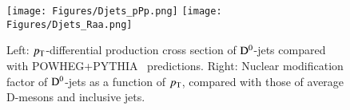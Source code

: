 \documentclass{webofc}
\newcommand{\pt}{p_{\rm T}}
\newcommand{\Dzero}{{\rm D^0}}
\begin{document}
\begin{figure}[h]
\centering
\texttt{[image: Figures/Djets\_pPp.png]}
\texttt{[image: Figures/Djets\_Raa.png]}
\caption{Left: $\pt$-differential production cross section of $\Dzero$-jets compared with POWHEG+PYTHIA~\cite{Nason:2004rx,Jadach:2015mza} predictions. Right: Nuclear modification factor of $\Dzero$-jets as a function of $\pt$, compared with those of average D-mesons and inclusive jets.}
\label{Djets}       %
\end{figure}


%
% 
%
%
%
%
\end{document}
